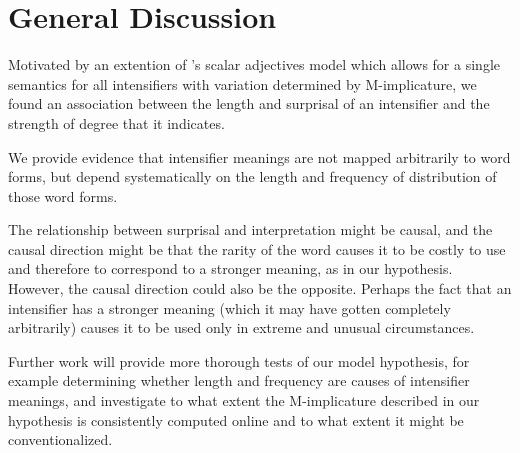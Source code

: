 \documentclass[10pt,letterpaper]{article}
\newcommand{\w}[1]{\emph{#1}}
\begin{document}
\section{General Discussion}

Motivated by an extention of 's scalar adjectives model which allows for a single semantics for all intensifiers with variation determined by M-implicature, we found an association between the length and surprisal of an intensifier and the strength of degree that it indicates.

We provide evidence that intensifier meanings are not mapped arbitrarily to word forms, but depend systematically on the length and frequency of distribution of those word forms.

%

The relationship between surprisal and interpretation might be causal, and the causal direction might be that the rarity of the word causes it to be costly to use and therefore to correspond to a stronger meaning, as in our hypothesis.
However, the causal direction could also be the opposite.
Perhaps the fact that an intensifier has a stronger meaning (which it may have gotten completely arbitrarily) causes it to be used only in extreme and unusual circumstances.

Further work will provide more thorough tests of our model hypothesis, for example determining whether length and frequency are causes of intensifier meanings, and investigate to what extent the M-implicature described in our hypothesis is consistently computed online and to what extent it might be conventionalized.
\end{document}

